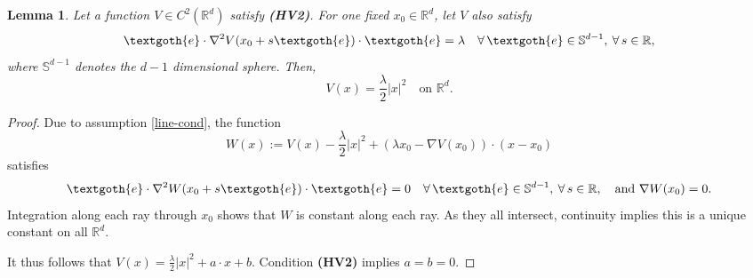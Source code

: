 \documentclass[reqno]{amsart}
\newtheorem{lemma}{Lemma}[section]
\newcommand{\R}{\mathbb{R}}
\newcommand{\SSS}{\mathbb{S}}
\newcommand{\Rd}{{\R^d}}
\begin{document}
\begin{lemma}\label{lem-parabolic}
Let a function $V\in C^2(\R^d)$ satisfy {\bf (HV2)}. For one fixed $x_0\in\R^d$, let $V$ also satisfy
\begin{equation}\label{line-cond}
  \textgoth{e}\cdot\nabla^2V(x_0+s\textgoth{e})\cdot \textgoth{e} = \lambda
\quad \forall\,\textgoth{e}\in \SSS^{d-1},\:\forall\, s\in\R,
\end{equation}
where $\SSS^{d-1}$ denotes the $d-1$ dimensional sphere. Then, 
\begin{equation*} %
  V(x)=\frac\lambda2 |x|^2 \quad \mbox{on } \Rd.
\end{equation*}
\end{lemma}
\begin{proof}
Due to assumption \eqref{line-cond}, the function
$$
  W(x):= V(x) - \frac\lambda2 |x|^2 + (\lambda x_0- \nabla V(x_0) )\cdot (x -x_0)
$$
satisfies 
$$
  \textgoth{e} \cdot \nabla^2 W(x_0 + s\textgoth{e}) \cdot \textgoth{e} = 0 \quad \forall\,\textgoth{e}\in \SSS^{d-1},\:\forall\, s\in\R,
  \quad \mbox{and } \nabla W(x_0)=0. 
$$
Integration along each ray through $x_0$ shows that  $W$ is constant along each ray. As they all intersect, continuity implies this is a unique constant on all $\R^d$.

It thus follows that $V(x) = \frac\lambda2 |x|^2 + a\cdot x + b$. Condition {\bf (HV2)} implies $a=b=0.$
%
\end{proof}
\end{document}
